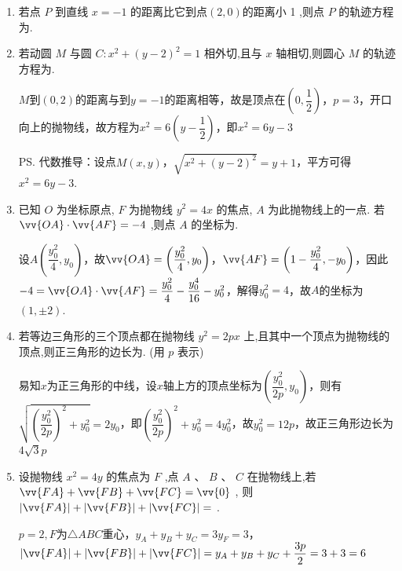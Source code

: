 \begin{enumerate}
    \item 若点 $P$ 到直线 $x =  - 1$ 的距离比它到点$(2,0)$的距离小 1 ,则点 $P$ 的轨迹方程为.

    \item 若动圆 $M$ 与圆 $C : {x}^{2} + {\left( y - 2\right) }^{2} = 1$ 相外切,且与 $x$ 轴相切,则圆心 $M$ 的轨迹方程为.
    \begin{jieda}
        $M$到$(0,2)$的距离与到$y = -1$的距离相等，故是顶点在$\left(0, \dfrac{1}{2}\right)$，$p = 3$，开口向上的抛物线，故方程为$x^2 = 6\left(y-\dfrac{1}{2}\right)$，即$x^2 = 6y - 3$

        \ps 代数推导：设点$M(x,y)$，$\sqrt{x^2+(y-2)^2} = y+1$，平方可得$x^2 = 6y-3$.
    \end{jieda}

    \item 已知 $O$ 为坐标原点, $F$ 为抛物线 ${y}^{2} = {4x}$ 的焦点, $A$ 为此抛物线上的一点. 若 $\vv{OA} \cdot  \vv{AF} =  - 4$ ,则点 $A$ 的坐标为.
    \begin{jieda}
        设$A\left(\dfrac{y_0^2}{4}, y_0\right)$，故$\vv{OA} = \left(\dfrac{y_0^2}{4}, y_0\right)$，$\vv{AF} = \left(1-\dfrac{y_0^2}{4}, -y_0\right)$，因此$-4 = \vv{OA} \cdot  \vv{AF} = \dfrac{y_0^2}{4} - \dfrac{y_0^4}{16} - y_0^2$，解得$y_0^2 = 4$，故$A$的坐标为$(1, \pm 2)$.
    \end{jieda}

    \item 若等边三角形的三个顶点都在抛物线 ${y}^{2} = {2px}$ 上,且其中一个顶点为抛物线的顶点,则正三角形的边长为. (用 ${p}$ 表示)
    \begin{jieda}
        易知$x$为正三角形的中线，设$x$轴上方的顶点坐标为$\left(\dfrac{y_0^2}{2p}, y_0\right)$，则有$\sqrt{\left(\dfrac{y_0^2}{2p}\right)^2+y_0^2} = 2y_0$，即$\left(\dfrac{y_0^2}{2p}\right)^2+y_0^2 = 4y_0^2$，故$y_0^2 = 12p$，故正三角形边长为$4\sqrt{3}p$
    \end{jieda}

    \item 设抛物线 ${x}^{2} = {4y}$ 的焦点为 ${F}$ ,点 $A\text{ 、 }B\text{ 、 }C$ 在抛物线上,若 $\vv{FA} + \vv{FB} + \vv{FC} = \vv{0}$ , 则 $\left| \vv{FA}\right|  + \left| \vv{FB}\right|  + \left| \vv{FC}\right|  =$ .
    \begin{jieda}
        $p = 2, F$为$\triangle ABC$重心，$y_A+y_B+y_C = 3y_F = 3$，$\left| \vv{FA}\right|  + \left| \vv{FB}\right|  + \left| \vv{FC}\right|  = y_A+y_B+y_C + \dfrac{3p}{2} = 3+3 = 6$
    \end{jieda}


\end{enumerate}
